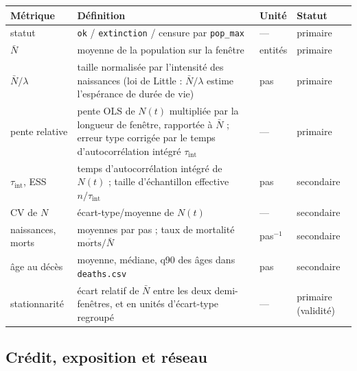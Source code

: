 \documentclass[11pt,a4paper]{article}
\newcommand{\code}[1]{\texttt{#1}}
\begin{document}
\begin{longtable}{p{}p{}p{}p{}}
\toprule
Métrique & Définition & Unité & Statut \\
\midrule
\endhead
statut & \code{ok} / \code{extinction} / censure par \code{pop\_max} &
--- & primaire \\
$\bar N$ & moyenne de la population sur la fenêtre & entités & primaire \\
$\bar N/\lambda$ & taille normalisée par l'intensité des naissances
(loi de Little : $\bar N/\lambda$ estime l'espérance de durée de vie) &
pas & primaire \\
pente relative & pente OLS de $N(t)$ multipliée par la longueur de fenêtre,
rapportée à $\bar N$ ; erreur type corrigée par le temps d'autocorrélation
intégré $\tau_{\mathrm{int}}$ & --- & primaire \\
$\tau_{\mathrm{int}}$, ESS & temps d'autocorrélation intégré de $N(t)$ ;
taille d'échantillon effective $n/\tau_{\mathrm{int}}$ & pas & secondaire \\
CV de $N$ & écart-type/moyenne de $N(t)$ & --- & secondaire \\
naissances, morts & moyennes par pas ; taux de mortalité
$\overline{\mathrm{morts}}/\bar N$ & pas$^{-1}$ & secondaire \\
âge au décès & moyenne, médiane, q90 des âges dans \code{deaths.csv} &
pas & secondaire \\
stationnarité & écart relatif de $\bar N$ entre les deux demi-fenêtres, et
en unités d'écart-type regroupé & --- & primaire (validité) \\
\bottomrule
\end{longtable}

\subsection{Crédit, exposition et réseau}
\end{document}

